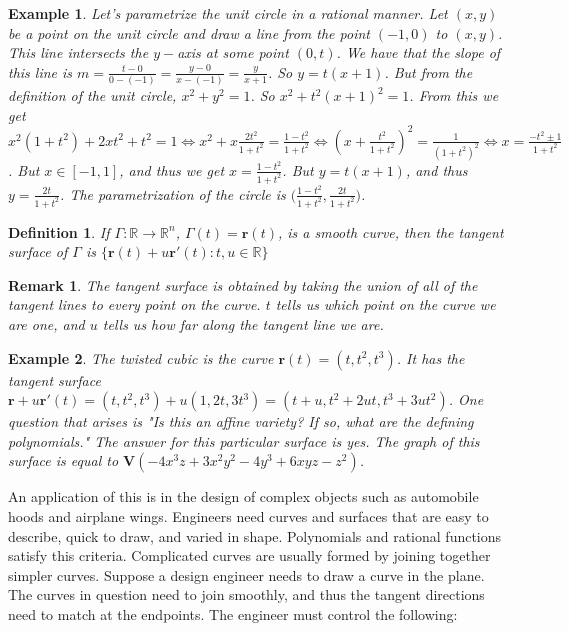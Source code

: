 \documentclass[oneside]{book}
\theoremstyle{mystyle}
\newtheorem{definition}{Definition}[section]
\newtheorem{example}{Example}[section]
\newtheorem{remark}{Remark}[section]
\begin{document}
\begin{example}
Let's parametrize the unit circle in a rational manner. Let $(x,y)$ be a point on the unit circle and draw a line from the point $(-1,0)$ to $(x,y)$. This line intersects the $y-$axis at some point $(0,t)$. We have that the slope of this line is $m = \frac{t-0}{0-(-1)} = \frac{y-0}{x-(-1)} = \frac{y}{x+1}$. So $y = t(x+1)$. But from the definition of the unit circle, $x^2+y^2=1$. So $x^2+t^2(x+1)^2 = 1$. From this we get $x^2(1+t^2)+2xt^2 + t^2 = 1 \Leftrightarrow x^2+x\frac{2t^2}{1+t^2} = \frac{1-t^2}{1+t^2} \Leftrightarrow (x+ \frac{t^2}{1+t^2})^2 = \frac{1 }{(1+t^2)^2}\Leftrightarrow x = \frac{-t^2 \pm 1}{1+t^2}$. But $x\in [-1,1]$, and thus we get $x = \frac{1-t^2}{1+t^2}$. But $y = t(x+1)$, and thus $y = \frac{2t}{1+t^2}$. The parametrization of the circle is $\big(\frac{1-t^2}{1+t^2},\frac{2t}{1+t^2}\big)$.
\end{example}
\begin{definition}
If $\Gamma:\mathbb{R}\rightarrow \mathbb{R}^n$, $\Gamma(t) = \mathbf{r}(t)$, is a smooth curve, then the tangent surface of $\Gamma$ is $\{\mathbf{r}(t)+u\mathbf{r}'(t):t,u\in \mathbb{R}\}$
\end{definition}
\begin{remark}
The tangent surface is obtained by taking the union of all of the tangent lines to every point on the curve. $t$ tells us which point on the curve we are one, and $u$ tells us how far along the tangent line we are.
\end{remark}
\begin{example}
The twisted cubic is the curve $\mathbf{r}(t) = (t,t^2,t^3)$. It has the tangent surface $\mathbf{r}+u\mathbf{r}'(t)=(t,t^2,t^3)+u(1,2t,3t^3) = (t+u,t^2+2ut,t^3+3ut^2)$. One question that arises is "Is this an affine variety? If so, what are the defining polynomials." The answer for this particular surface is yes. The graph of this surface is equal to $\mathbf{V}(-4x^3z+3x^2y^2-4y^3+6xyz-z^2)$.
\end{example}
An application of this is in the design of complex objects such as automobile hoods and airplane wings. Engineers need curves and surfaces that are easy to describe, quick to draw, and varied in shape. Polynomials and rational functions satisfy this criteria. Complicated curves are usually formed by joining together simpler curves. Suppose a design engineer needs to draw a curve in the plane. The curves in question need to join smoothly, and thus the tangent directions need to match at the endpoints. The engineer must control the following:
\end{document}
